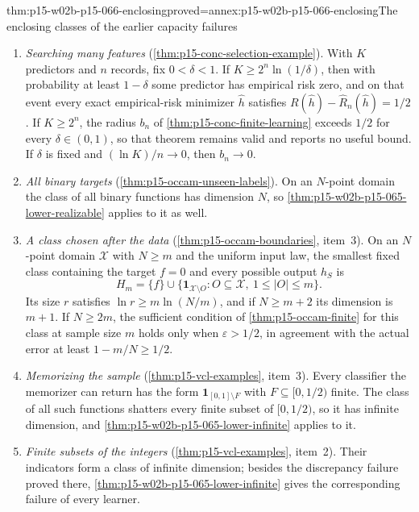 \begin{hbtheorem}{thm:p15-w02b-p15-066-enclosing}{proved=annex:p15-w02b-p15-066-enclosing}{The enclosing classes of the earlier capacity failures}
\begin{enumerate}
\item \emph{Searching many features}
      (\cref{thm:p15-conc-selection-example}). With \(K\) predictors and
      \(n\) records, fix \(0<\delta<1\). If
      \(K\geq2^n\ln(1/\delta)\), then with probability at least
      \(1-\delta\) some predictor has empirical risk zero, and on that
      event every exact empirical-risk minimizer \(\widehat h\) satisfies
      \(R(\widehat h)-\widehat R_n(\widehat h)=1/2\).
      If \(K\geq2^n\), the radius \(b_n\) of
      \cref{thm:p15-conc-finite-learning} exceeds \(1/2\) for every
      \(\delta\in(0,1)\), so that theorem remains valid and reports no
      useful bound. If \(\delta\) is fixed and \((\ln K)/n\to0\), then
      \(b_n\to0\).
\item \emph{All binary targets}
      (\cref{thm:p15-occam-unseen-labels}). On an \(N\)-point domain the
      class of all binary functions has dimension \(N\), so
      \cref{thm:p15-w02b-p15-065-lower-realizable} applies to it as
      well.
\item \emph{A class chosen after the data}
      (\cref{thm:p15-occam-boundaries}, item~3). On an \(N\)-point domain
      \(\mathcal X\) with \(N\geq m\) and the uniform input law, the
      smallest fixed class containing the target \(f=0\) and every
      possible output \(h_S\) is
      \[
       H_m=\{f\}\cup\{\mathbf1_{\mathcal X\setminus O}:O\subseteq\mathcal X,\ 1\leq|O|\leq m\}.
      \]
      Its size \(r\) satisfies \(\ln r\geq m\ln(N/m)\), and if
      \(N\geq m+2\) its dimension is \(m+1\). If \(N\geq2m\), the sufficient condition
      of \cref{thm:p15-occam-finite} for this class at sample size \(m\)
      holds only when \(\varepsilon>1/2\), in agreement with the actual
      error at least \(1-m/N\geq1/2\).
\item \emph{Memorizing the sample}
      (\cref{thm:p15-vcl-examples}, item~3). Every classifier the
      memorizer can return has the form
      \(\mathbf1_{[0,1]\setminus F}\) with \(F\subseteq[0,1/2)\) finite.
      The class of all such functions shatters every finite subset of
      \([0,1/2)\), so it has infinite dimension, and
      \cref{thm:p15-w02b-p15-065-lower-infinite} applies to it.
\item \emph{Finite subsets of the integers}
      (\cref{thm:p15-vcl-examples}, item~2). Their indicators form a
      class of infinite dimension; besides the discrepancy failure
      proved there, \cref{thm:p15-w02b-p15-065-lower-infinite}
      gives the corresponding failure of every learner.
\end{enumerate}
\end{hbtheorem}

